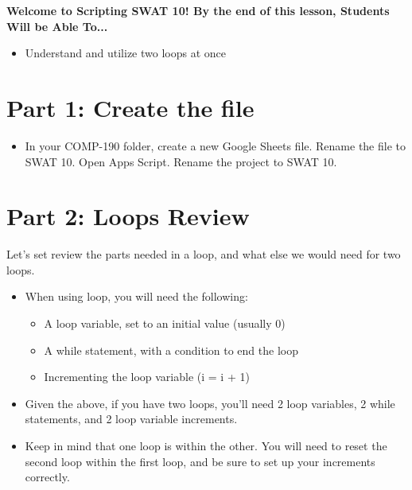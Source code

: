 \documentclass{article}
\newcommand{\AName}{Scripting SWAT 10}
\begin{document}
\textbf{Welcome to \AName!  By the end of this lesson, Students Will be Able To...}
\begin{itemize}
    \item Understand and utilize two loops at once
\end{itemize}


\section*{Part 1: Create the file}
\begin{itemize}
    \item In your COMP-190 folder, create a new Google Sheets file. Rename the file to SWAT 10.  Open Apps Script.  Rename the project to SWAT 10.
\end{itemize}

\section*{Part 2: Loops Review}
Let's set review the parts needed in a loop, and what else we would need for two loops.
\begin{itemize}
    \item When using loop, you will need the following:
    \begin{itemize}
    		\item A loop variable, set to an initial value (usually 0)
    		\item A while statement, with a condition to end the loop
    		\item Incrementing the loop variable (i = i + 1)
    	\end{itemize}
    	\item Given the above, if you have two loops, you'll need 2 loop variables, 2 while statements, and 2 loop variable increments. 
    	\item Keep in mind that one loop is within the other. You will need to reset the second loop within the first loop, and be sure to set up your increments correctly.
\end{itemize}
\end{document}
